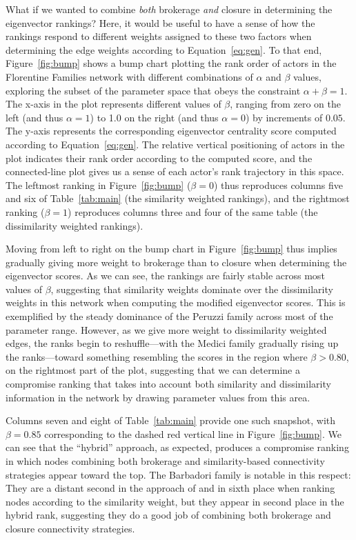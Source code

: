 \documentclass[12pt]{article}
\begin{document}
What if we wanted to combine \textit{both} brokerage \textit{and} closure in determining the eigenvector rankings? Here, it would be useful to have a sense of how the rankings respond to different weights assigned to these two factors when determining the edge weights according to Equation~\ref{eq:gen}. To that end, Figure~\ref{fig:bump} shows a bump chart plotting the rank order of actors in the Florentine Families network with different combinations of $\alpha$ and $\beta$ values, exploring the subset of the parameter space that obeys the constraint $\alpha + \beta = 1$. The x-axis in the plot represents different values of $\beta$, ranging from zero on the left (and thus $\alpha = 1$) to 1.0 on the right (and thus $\alpha = 0$) by increments of $0.05$. The y-axis represents the corresponding eigenvector centrality score computed according to Equation~\ref{eq:gen}. The relative vertical positioning of actors in the plot indicates their rank order according to the computed score, and the connected-line plot gives us a sense of each actor's rank trajectory in this space. The leftmost ranking in Figure~\ref{fig:bump} ($\beta = 0$) thus reproduces columns five and six of Table~\ref{tab:main} (the similarity weighted rankings), and the rightmost ranking ($\beta = 1$) reproduces columns three and four of the same table (the dissimilarity weighted rankings). 

Moving from left to right on the bump chart in Figure~\ref{fig:bump} thus implies gradually giving more weight to brokerage than to closure when determining the eigenvector scores. As we can see, the rankings are fairly stable across most values of $\beta$, suggesting that similarity weights dominate over the dissimilarity weights in this network when computing the modified eigenvector scores. This is exemplified by the steady dominance of the Peruzzi family across most of the parameter range. However, as we give more weight to dissimilarity weighted edges, the ranks begin to reshuffle---with the Medici family gradually rising up the ranks---toward something resembling the \citet{alvarez-socorro2015eigencentrality-66c} scores in the region where $\beta > 0.80$, on the rightmost part of the plot, suggesting that we can determine a compromise ranking that takes into account both similarity and dissimilarity information in the network by drawing parameter values from this area. 

Columns seven and eight of Table~\ref{tab:main} provide one such snapshot, with $\beta = 0.85$ corresponding to the dashed red vertical line in Figure~\ref{fig:bump}. We can see that the ``hybrid'' approach, as expected, produces a compromise ranking in which nodes combining both brokerage and similarity-based connectivity strategies appear toward the top. The Barbadori family is notable in this respect: They are a distant second in the approach of \citet{alvarez-socorro2015eigencentrality-66c} and in sixth place when ranking nodes according to the similarity weight, but they appear in second place in the hybrid rank, suggesting they do a good job of combining both brokerage and closure connectivity strategies.  
\end{document}

